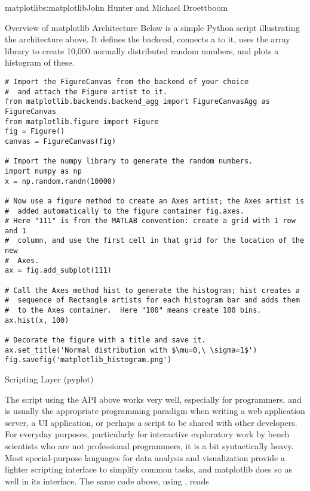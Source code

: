 \begin{aosachapter}{matplotlib}{s:matplotlib}{John Hunter and Michael Droettboom}
\begin{aosasect1}{Overview of matplotlib Architecture}
Below is a simple Python script illustrating the architecture above.
It defines the backend, connects a  to it, uses the array
library  to create 10,000 normally distributed random numbers,
and plots a histogram of these.


\begin{verbatim}
# Import the FigureCanvas from the backend of your choice
#  and attach the Figure artist to it.
from matplotlib.backends.backend_agg import FigureCanvasAgg as FigureCanvas
from matplotlib.figure import Figure
fig = Figure()
canvas = FigureCanvas(fig)

# Import the numpy library to generate the random numbers.
import numpy as np
x = np.random.randn(10000)

# Now use a figure method to create an Axes artist; the Axes artist is
#  added automatically to the figure container fig.axes.
# Here "111" is from the MATLAB convention: create a grid with 1 row and 1
#  column, and use the first cell in that grid for the location of the new
#  Axes.
ax = fig.add_subplot(111)

# Call the Axes method hist to generate the histogram; hist creates a
#  sequence of Rectangle artists for each histogram bar and adds them
#  to the Axes container.  Here "100" means create 100 bins.
ax.hist(x, 100)

# Decorate the figure with a title and save it.
ax.set_title('Normal distribution with $\mu=0,\ \sigma=1$')
fig.savefig('matplotlib_histogram.png')
\end{verbatim}

\begin{aosasect2}{Scripting Layer (pyplot)}

The script using the API above works very well, especially for programmers,
and is usually the appropriate programming paradigm when writing a
web application server, a UI application, or perhaps a script to be
shared with other developers.  For everyday purposes, particularly
for interactive exploratory work by bench scientists who are not
professional programmers, it is a bit syntactically heavy.  Most
special-purpose languages for data analysis and visualization
provide a lighter scripting interface to simplify common tasks, and
matplotlib does so as well in its 
interface.  The same code above, using , reads


\end{aosasect2}
\end{aosasect1}
\end{aosachapter}

